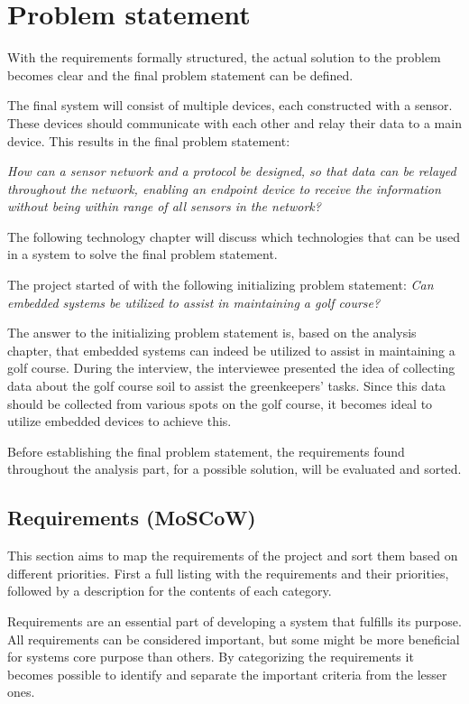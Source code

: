 \chapter{Problem statement}
With the requirements formally structured, the actual solution to the problem becomes clear and the final problem statement can be defined.

The final system will consist of multiple devices, each constructed with a sensor. These devices should communicate with each other and relay their data to a main device. This results in the final problem statement:

\textit{How can a sensor network and a protocol be designed, so that data can be relayed throughout the network, enabling an endpoint device to receive the information without being within range of all sensors in the network?}

The following technology chapter will discuss which technologies that can be used in a system to solve the final problem statement.

The project started of with the following initializing problem statement:
\textit{Can embedded systems be utilized to assist in maintaining a golf course?}

The answer to the initializing problem statement is, based on the analysis chapter, that embedded systems can indeed be utilized to assist in maintaining a golf course. During the interview, the interviewee presented the idea of collecting data about the golf course soil to assist the greenkeepers' tasks. Since this data should be collected from various spots on the golf course, it becomes ideal to utilize embedded devices to achieve this.

Before establishing the final problem statement, the requirements found throughout the analysis part, for a possible solution, will be evaluated and sorted.

\section{Requirements (MoSCoW)}
This section aims to map the requirements of the project and sort them based on different priorities. First a full listing with the requirements and their priorities, followed by a description for the contents of each category.

Requirements are an essential part of developing a system that fulfills its purpose. All requirements can be considered important, but some might be more beneficial for systems core purpose than others. By categorizing the requirements it becomes possible to identify and separate the important criteria from the lesser ones. 

